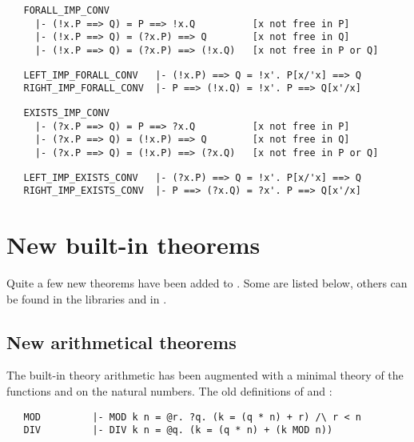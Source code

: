 \begin{hol}\begin{verbatim}
   FORALL_IMP_CONV   
     |- (!x.P ==> Q) = P ==> !x.Q          [x not free in P]
     |- (!x.P ==> Q) = (?x.P) ==> Q        [x not free in Q]
     |- (!x.P ==> Q) = (?x.P) ==> (!x.Q)   [x not free in P or Q]
\end{verbatim}\end{hol}

\begin{hol}\begin{verbatim}
   LEFT_IMP_FORALL_CONV   |- (!x.P) ==> Q = !x'. P[x/'x] ==> Q
   RIGHT_IMP_FORALL_CONV  |- P ==> (!x.Q) = !x'. P ==> Q[x'/x]
\end{verbatim}\end{hol}

\begin{hol}\begin{verbatim}
   EXISTS_IMP_CONV   
     |- (?x.P ==> Q) = P ==> ?x.Q          [x not free in P]
     |- (?x.P ==> Q) = (!x.P) ==> Q        [x not free in Q]
     |- (?x.P ==> Q) = (!x.P) ==> (?x.Q)   [x not free in P or Q]
\end{verbatim}\end{hol}

\begin{hol}\begin{verbatim}
   LEFT_IMP_EXISTS_CONV   |- (?x.P) ==> Q = !x'. P[x/'x] ==> Q
   RIGHT_IMP_EXISTS_CONV  |- P ==> (?x.Q) = ?x'. P ==> Q[x'/x]
\end{verbatim}\end{hol}

\section{New built-in theorems}\label{THEOREMS}

Quite a few new theorems have been added to \HOL.  Some are listed
below, others can be found in the libraries and in .

\subsection{New arithmetical theorems}

The built-in theory arithmetic has been augmented with a minimal theory of
the functions  and  on the natural numbers.  The old definitions of
 and :

\begin{hol}\begin{verbatim}
   MOD         |- MOD k n = @r. ?q. (k = (q * n) + r) /\ r < n
   DIV         |- DIV k n = @q. (k = (q * n) + (k MOD n))
\end{verbatim}\end{hol}

